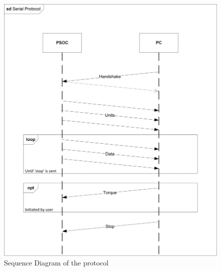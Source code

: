 \begin{figure}[h]
	\centering
	\includegraphics[width=1\linewidth]{Protocol/SD_Protocol}
	\caption{Sequence Diagram of the protocol}
	\label{fig:SeqDiagram}
\end{figure}

